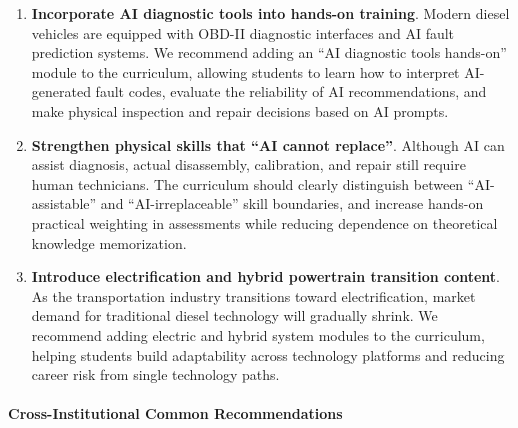 \begin{enumerate}[label=\roman*.]
    \item \textbf{Incorporate AI diagnostic tools into hands-on training}. Modern diesel vehicles are equipped with OBD-II diagnostic interfaces and AI fault prediction systems. We recommend adding an ``AI diagnostic tools hands-on'' module to the curriculum, allowing students to learn how to interpret AI-generated fault codes, evaluate the reliability of AI recommendations, and make physical inspection and repair decisions based on AI prompts.
    \item \textbf{Strengthen physical skills that ``AI cannot replace''}. Although AI can assist diagnosis, actual disassembly, calibration, and repair still require human technicians. The curriculum should clearly distinguish between ``AI-assistable'' and ``AI-irreplaceable'' skill boundaries, and increase hands-on practical weighting in assessments while reducing dependence on theoretical knowledge memorization.
    \item \textbf{Introduce electrification and hybrid powertrain transition content}. As the transportation industry transitions toward electrification, market demand for traditional diesel technology will gradually shrink. We recommend adding electric and hybrid system modules to the curriculum, helping students build adaptability across technology platforms and reducing career risk from single technology paths.
\end{enumerate}

\paragraph{Cross-Institutional Common Recommendations}

